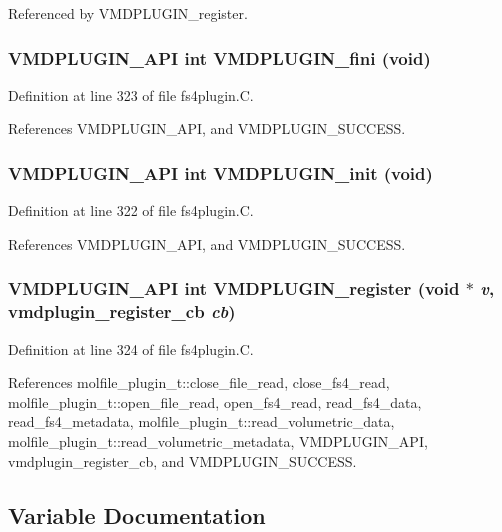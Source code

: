 Referenced by VMDPLUGIN\_\-register.
\subsubsection{\setlength{\rightskip}{0pt plus 5cm}VMDPLUGIN\_\-API int VMDPLUGIN\_\-fini (void)}\label{fs4plugin_8C_a7}




Definition at line 323 of file fs4plugin.C.

References VMDPLUGIN\_\-API, and VMDPLUGIN\_\-SUCCESS.
\subsubsection{\setlength{\rightskip}{0pt plus 5cm}VMDPLUGIN\_\-API int VMDPLUGIN\_\-init (void)}\label{fs4plugin_8C_a6}




Definition at line 322 of file fs4plugin.C.

References VMDPLUGIN\_\-API, and VMDPLUGIN\_\-SUCCESS.
\subsubsection{\setlength{\rightskip}{0pt plus 5cm}VMDPLUGIN\_\-API int VMDPLUGIN\_\-register (void $\ast$ {\em v}, {\bf vmdplugin\_\-register\_\-cb} {\em cb})}\label{fs4plugin_8C_a8}




Definition at line 324 of file fs4plugin.C.

References molfile\_\-plugin\_\-t::close\_\-file\_\-read, close\_\-fs4\_\-read, molfile\_\-plugin\_\-t::open\_\-file\_\-read, open\_\-fs4\_\-read, read\_\-fs4\_\-data, read\_\-fs4\_\-metadata, molfile\_\-plugin\_\-t::read\_\-volumetric\_\-data, molfile\_\-plugin\_\-t::read\_\-volumetric\_\-metadata, VMDPLUGIN\_\-API, vmdplugin\_\-register\_\-cb, and VMDPLUGIN\_\-SUCCESS.

\subsection{Variable Documentation}
